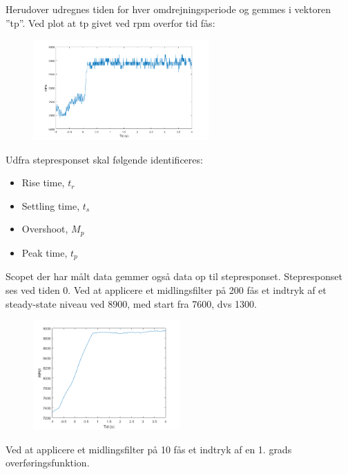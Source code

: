 Herudover udregnes tiden for hver omdrejningsperiode og gemmes i vektoren ”tp”.
Ved plot at tp givet ved rpm overfor tid fås:

\begin{figure}[h]
  \centering
  \includegraphics[width=0.6\textwidth]{mo3.png}
  \caption{}
  \label{fig:mo3}
\end{figure}


\label{sec:overforingsfunktion}
Udfra stepresponset skal følgende identificeres:

\begin{itemize}
\item Rise time, $t_r$
\item Settling time, $t_s$
\item Overshoot, $M_p$
\item Peak time, $t_p$
\end{itemize}

Scopet der har målt data gemmer også data op til stepresponset. Stepresponset ses ved tiden 0.
Ved at applicere et midlingsfilter på 200 fås et indtryk af et steady-state niveau ved 8900, med start fra 7600, dvs 1300. 

\begin{figure}[h]
  \centering
  \includegraphics[width=0.5\textwidth]{mo4.png}
  \caption{}
  \label{fig:mo4}
\end{figure}

Ved at applicere et midlingsfilter på 10 fås et indtryk af en 1. grads overføringsfunktion.

